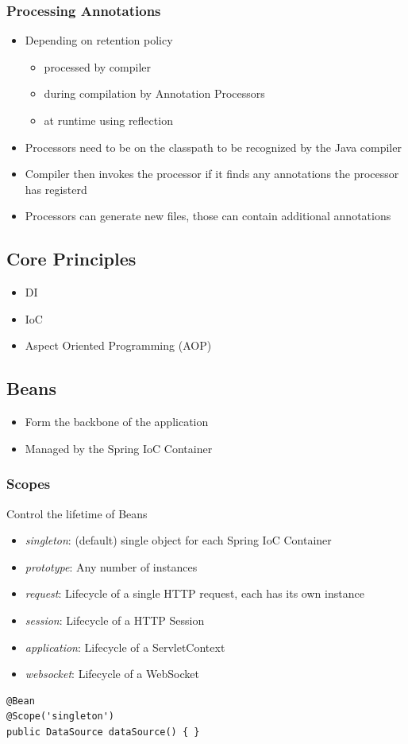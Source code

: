 \subsubsection{Processing Annotations}
\begin{itemize}
    \item Depending on retention policy
    \begin{itemize}
        \item processed by compiler
        \item during compilation by Annotation Processors
        \item at runtime using reflection
    \end{itemize}
    \item Processors need to be on the classpath to be recognized by the Java compiler
    \item Compiler then invokes the processor if it finds any annotations the processor has registerd
    \item Processors can generate new files, those can contain additional annotations
\end{itemize}

\subsection{Core Principles}
\begin{itemize}
    \item DI
    \item IoC
    \item Aspect Oriented Programming (AOP)
\end{itemize}

\subsection{Beans}
\begin{itemize}
    \item Form the backbone of the application
    \item Managed by the Spring IoC Container
\end{itemize}
\subsubsection{Scopes}
Control the lifetime of Beans
\begin{itemize}
    \item \textit{singleton}: (default) single object for each Spring IoC Container
    \item \textit{prototype}: Any number of instances
    \item \textit{request}: Lifecycle of a single HTTP request, each has its own instance
    \item \textit{session}: Lifecycle of a HTTP Session
    \item \textit{application}: Lifecycle of a ServletContext 
    \item \textit{websocket}: Lifecycle of a WebSocket
\end{itemize}
\begin{lstlisting}
@Bean 
@Scope('singleton')
public DataSource dataSource() { }
\end{lstlisting}

